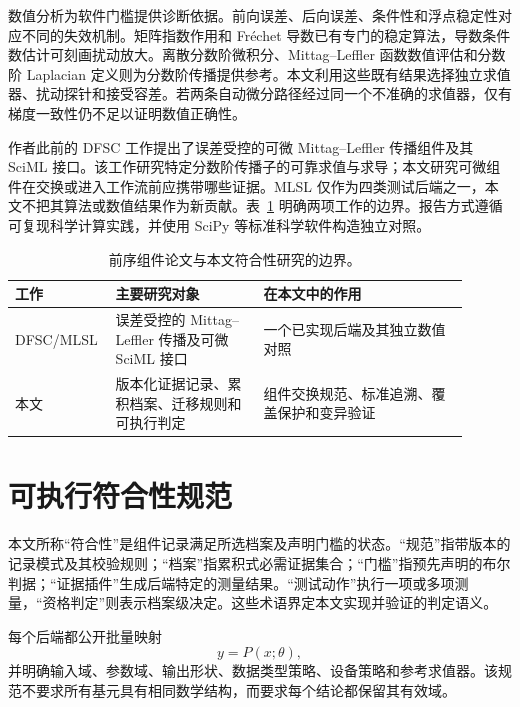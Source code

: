 \documentclass[preprint,12pt,authoryear]{elsarticle}
\begin{document}
数值分析为软件门槛提供诊断依据。前向误差、后向误差、条件性和浮点稳定性对应不同的失效机制\citep{higham2002accuracy}。矩阵指数作用和 Fr\'echet 导数已有专门的稳定算法\citep{almohy2011action,almohy2009frechet}，导数条件数估计可刻画扰动放大\citep{higham2008functions,higham2014frechet}。离散分数阶微积分\citep{lubich1986discretized}、Mittag--Leffler 函数数值评估\citep{garrappa2015mittag,gorenflo2014mittag}和分数阶 Laplacian 定义\citep{lischke2020fractional}则为分数阶传播提供参考。本文利用这些既有结果选择独立求值器、扰动探针和接受容差。若两条自动微分路径经过同一个不准确的求值器，仅有梯度一致性仍不足以证明数值正确性。

作者此前的 DFSC 工作提出了误差受控的可微 Mittag--Leffler 传播组件及其 SciML 接口\citep{hu2026dfsc}。该工作研究特定分数阶传播子的可靠求值与求导；本文研究可微组件在交换或进入工作流前应携带哪些证据。MLSL 仅作为四类测试后端之一，本文不把其算法或数值结果作为新贡献。表~\ref{tab:p1-p4-boundary-zh} 明确两项工作的边界。报告方式遵循可复现科学计算实践\citep{wilson2017goodenough}，并使用 SciPy 等标准科学软件构造独立对照\citep{virtanen2020scipy}。

\begin{table}[t]
\centering
\small
\caption{前序组件论文与本文符合性研究的边界。}
\label{tab:p1-p4-boundary-zh}
\begin{tabular}{p{0.16\linewidth}p{0.31\linewidth}p{0.43\linewidth}}
\toprule
工作 & 主要研究对象 & 在本文中的作用\\
\midrule
DFSC/MLSL \citep{hu2026dfsc} & 误差受控的 Mittag--Leffler 传播及可微 SciML 接口 & 一个已实现后端及其独立数值对照\\
本文 & 版本化证据记录、累积档案、迁移规则和可执行判定 & 组件交换规范、标准追溯、覆盖保护和变异验证\\
\bottomrule
\end{tabular}
\end{table}

\section{可执行符合性规范}
本文所称“符合性”是组件记录满足所选档案及声明门槛的状态。“规范”指带版本的记录模式及其校验规则；“档案”指累积式必需证据集合；“门槛”指预先声明的布尔判据；“证据插件”生成后端特定的测量结果。“测试动作”执行一项或多项测量，“资格判定”则表示档案级决定。这些术语界定本文实现并验证的判定语义。

每个后端都公开批量映射
\begin{equation}
 y=P(x;\theta),
\end{equation}
并明确输入域、参数域、输出形状、数据类型策略、设备策略和参考求值器。该规范不要求所有基元具有相同数学结构，而要求每个结论都保留其有效域。
\end{document}
